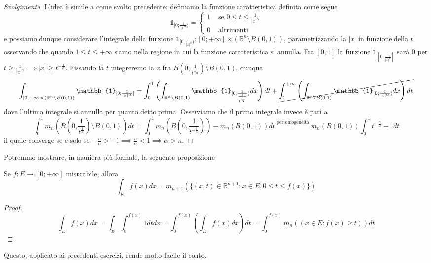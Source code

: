 \begin{proof}[Svolgimento]
	L'idea è simile a come svolto precedente: definiamo la funzione caratteristica definita come segue
	$$
	\mathbb{1}_{[0; \frac{1}{|x|^\alpha})} = \begin{cases} 1 & \text{ se } 0 \leq t \leq \frac{1}{|x|^\alpha} \\
		0 & \text{ altrimenti }
	\end{cases}
	$$
	e possiamo dunque considerare l'integrale della funzione $\mathbb{1}_{[0; \frac{1}{|x|^\alpha})} : [0; +\infty] \times (\mathbb{R}^n \setminus B(0,1))$, parametrizzando la $|x|$ in funzione della $t$ osservando che quando $1 \leq t \leq +\infty$ siamo nella regione in cui la funzione caratteristica si annulla. Fra $[0, 1]$ la funzione $\mathbb{1}_{[0; \frac{1}{|x|^\alpha}]}$ sarà $0$ per $t \geq \frac{1}{|x|^\alpha} \implies |x| \geq t^{-\frac{1}{\alpha}}$. Fissando la $t$ integreremo la $x$ fra $B(0, \frac{1}{t^{-\frac{1}{\alpha}}}) \setminus B(0,1)$, dunque
	$$
	\int_{[0, +\infty] \times (\mathbb{R}^n \setminus B(0,1))} \mathbb{1}_{[0; \frac{1}{|x|^\alpha}]} = \int_0^{1} \left(\int_{\mathbb{R}^n \setminus B(0,1)} \mathbb{1}_{[0; \frac{1}{\frac{1}{t^{\frac{1}{\alpha}}}})} dx \right) dt + \cancel{\int_1^{+\infty} \left( \int_{\mathbb{R}^n \setminus B(0, 1)} \mathbb{1}_{[0; \frac{1}{|x|^\alpha})} dx \right) dt}
	$$
	dove l'ultimo integrale si annulla per quanto detto prima. Osserviamo che il primo integrale invece è pari a
	$$
	\int_0^1 m_n \left(B \left(0, \frac{1}{t^{\frac{1}{\alpha}}} \right) \setminus B(0,1) \right)dt = \int_0^1 m_n \left( B \left(0, \frac{1}{t^{-\frac{1}{\alpha}}}\right) \right) - m_n(B(0, 1))dt \stackrel{\text{per omogeneità}}{=} m_n(B(0,1))\int_0^1 t^{-\frac{n}{\alpha}} - 1 dt
	$$
	il quale converge se e solo se $-\frac{n}{\alpha} > - 1 \implies \frac{n}{\alpha} < 1 \implies \alpha > n$.
\end{proof}
Potremmo mostrare, in maniera più formale, la seguente proposizione
\begin{prop}
	Se $f: E \to [0; +\infty]$ misurabile, allora
$$
\int_E f(x)dx = m_{n+1}(\{(x,t) \in \mathbb{R}^{n+1}: x \in E, 0 \leq t \leq f(x) \})
$$
\end{prop}
\begin{proof}
$$
\int_E f(x)dx = \int_E \int_0^{f(x)} 1 dtdx = \int_0^{f(x)} \left( \int_E f(x) dx \right) dt = \int_0^{f(x)} m_n({(x \in E: f(x) \geq t)})dt
$$
\end{proof}
Questo, applicato ai precedenti esercizi, rende molto facile il conto.
